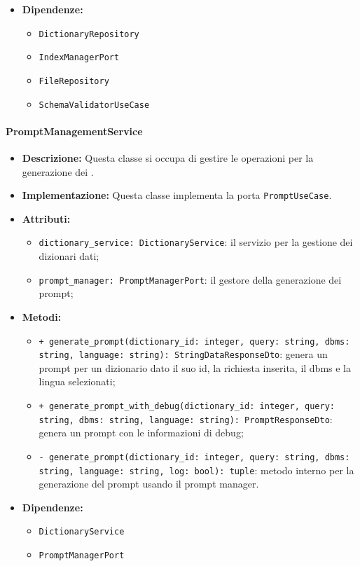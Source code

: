 \begin{itemize}
\begin{itemize}
    \end{itemize}
    \item \textbf{Dipendenze:}
    \begin{itemize}
        \item \texttt{DictionaryRepository}
        \item \texttt{IndexManagerPort}
        \item \texttt{FileRepository}
        \item \texttt{SchemaValidatorUseCase}
    \end{itemize}
\end{itemize}

\paragraph{PromptManagementService}

\begin{itemize}
    \item \textbf{Descrizione:} Questa classe si occupa di gestire le operazioni per la generazione dei .
    \item \textbf{Implementazione:} Questa classe implementa la porta \texttt{PromptUseCase}. 
    \item \textbf{Attributi:}
    \begin{itemize}
        \item \texttt{dictionary\_service: DictionaryService}: il servizio per la gestione dei dizionari dati;
        \item \texttt{prompt\_manager: PromptManagerPort}: il gestore della generazione dei prompt;
    \end{itemize}
    \item \textbf{Metodi:}
    \begin{itemize}
        \item \texttt{+ generate\_prompt(dictionary\_id: integer, query: string, dbms: string, language: string): StringDataResponseDto}: genera un prompt per un dizionario dato il suo id, la richiesta inserita, il dbms e la lingua selezionati;
        \item \texttt{+ generate\_prompt\_with\_debug(dictionary\_id: integer, query: string, dbms: string, language: string): PromptResponseDto}: genera un prompt con le informazioni di debug;
        \item \texttt{- generate\_prompt(dictionary\_id: integer, query: string, dbms: string, language: string, log: bool): tuple}: metodo interno per la generazione del prompt usando il prompt manager.
    \end{itemize}
    \item \textbf{Dipendenze:}
    \begin{itemize}
        \item \texttt{DictionaryService}
        \item \texttt{PromptManagerPort}
    \end{itemize}
\end{itemize}  